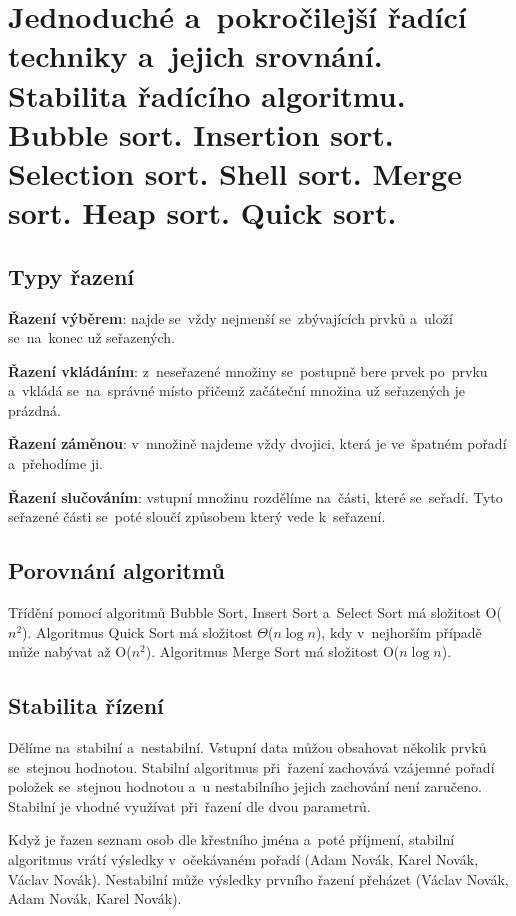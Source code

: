\clearpage
\section{Jednoduché a~pokročilejší řadící techniky a~jejich srovnání. Stabilita řadícího algoritmu. Bubble sort. Insertion sort. Selection sort. Shell sort. Merge sort. Heap sort. Quick sort.}

\subsection{Typy řazení}

\textbf{Řazení výběrem}: najde se~vždy nejmenší se~zbývajících prvků a~uloží se~na~konec už seřazených.

\textbf{Řazení vkládáním}: z~neseřazené množiny se~postupně bere prvek po~prvku a~vkládá se~na~správné místo přičemž začáteční množina už seřazených je prázdná.

\textbf{Řazení záměnou}: v~množině najdeme vždy dvojici, která je ve~špatném pořadí a~přehodíme ji.

\textbf{Řazení slučováním}: vstupní množinu rozdělíme na~části, které se~seřadí. Tyto seřazené části se~poté sloučí způsobem který vede k~seřazení.

\subsection{Porovnání algoritmů}

Třídění pomocí algoritmů Bubble Sort, Insert Sort a~Select Sort má složitost O($n^2$). Algoritmus Quick Sort má složitost $\Theta$($n\log{n}$), kdy v~nejhorším případě může nabývat až O($n^2$). Algoritmus Merge Sort má složitost O($n\log{n}$).

\subsection{Stabilita řízení}

Dělíme na~stabilní a~nestabilní. Vstupní data můžou obsahovat několik prvků se~stejnou hodnotou. Stabilní algoritmus při~řazení zachovává vzájemné pořadí položek se~stejnou hodnotou a~u nestabilního jejich zachování není zaručeno. Stabilní je vhodné využívat při~řazení dle dvou parametrů.

Když je řazen seznam osob dle křestního jména a~poté příjmení, stabilní algoritmus vrátí výsledky v~očekávaném pořadí (Adam Novák, Karel Novák, Václav Novák). Nestabilní může výsledky prvního řazení přeházet (Václav Novák, Adam Novák, Karel Novák).

